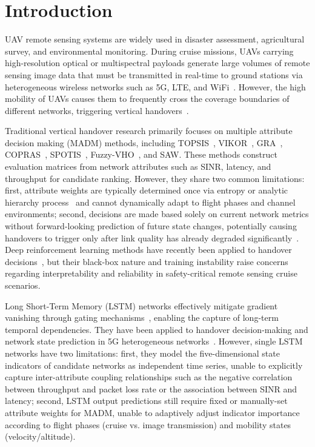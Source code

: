 \documentclass[journal,article,submit,moreauthors]{Definitions/mdpi}
\begin{document}
\section{Introduction}
\label{sec:introduction}

UAV remote sensing systems are widely used in disaster assessment, agricultural survey, and environmental monitoring. During cruise missions, UAVs carrying high-resolution optical or multispectral payloads generate large volumes of remote sensing image data that must be transmitted in real-time to ground stations via heterogeneous wireless networks such as 5G, LTE, and WiFi~\cite{ref1,ref2,ref3}. However, the high mobility of UAVs causes them to frequently cross the coverage boundaries of different networks, triggering vertical handovers~\cite{ref4}.

Traditional vertical handover research primarily focuses on multiple attribute decision making (MADM) methods, including TOPSIS~\cite{ref7,ref8}, VIKOR~\cite{ref22}, GRA~\cite{ref22}, COPRAS~\cite{ref22}, SPOTIS~\cite{ref22}, Fuzzy-VHO~\cite{ref4}, and SAW. These methods construct evaluation matrices from network attributes such as SINR, latency, and throughput for candidate ranking. However, they share two common limitations: first, attribute weights are typically determined once via entropy or analytic hierarchy process~\cite{ref10,ref11} and cannot dynamically adapt to flight phases and channel environments; second, decisions are made based solely on current network metrics without forward-looking prediction of future state changes, potentially causing handovers to trigger only after link quality has already degraded significantly~\cite{ref12,ref13}. Deep reinforcement learning methods have recently been applied to handover decisions~\cite{ref12,ref14}, but their black-box nature and training instability raise concerns regarding interpretability and reliability in safety-critical remote sensing cruise scenarios.

Long Short-Term Memory (LSTM) networks effectively mitigate gradient vanishing through gating mechanisms~\cite{ref15}, enabling the capture of long-term temporal dependencies. They have been applied to handover decision-making and network state prediction in 5G heterogeneous networks~\cite{ref16,ref17}. However, single LSTM networks have two limitations: first, they model the five-dimensional state indicators of candidate networks as independent time series, unable to explicitly capture inter-attribute coupling relationships such as the negative correlation between throughput and packet loss rate or the association between SINR and latency; second, LSTM output predictions still require fixed or manually-set attribute weights for MADM, unable to adaptively adjust indicator importance according to flight phases (cruise vs. image transmission) and mobility states (velocity/altitude).
\end{document}
